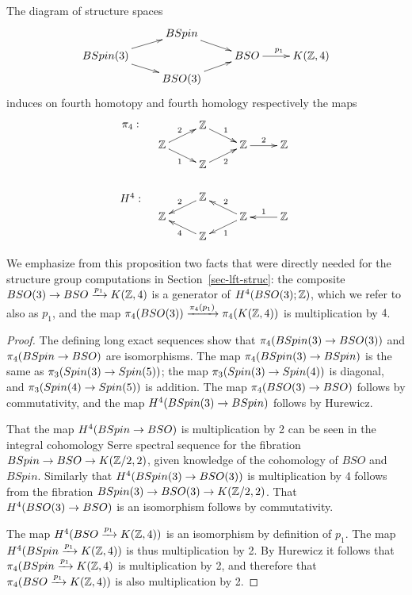 \documentclass{amsart}
\begin{document}
\begin{proposition} 
\label{prop-H4}
The diagram of structure spaces
\[
\xymatrix@R=5pt{
& BSpin \ar[dr] & & \\
BSpin(3) \ar[ur] \ar[dr] && BSO \ar[r]^{p_1} & K(\ZZ,4) \\
& BSO(3) \ar[ur] & &
}
\]
induces on fourth homotopy and fourth homology respectively the maps
\[
\xymatrix@R=5pt{
\save[]+<-1cm,0cm>*{\pi_4:}\restore & \ZZ \ar[dr]^{1} & & \\
\ZZ \ar[ur]^{2} \ar[dr]_{1} && \ZZ \ar[r]^{2} & \ZZ \\
& \ZZ \ar[ur]_{2} & & \\
&&& \\
\save[]+<-1cm,0cm>*{H^4:}\restore & \ZZ \ar[dl]_{2} & & \\
\ZZ && \ZZ \ar[ul]_{2} \ar[dl]^{1} & \ZZ \ar[l]_{1} \\
& \ZZ \ar[ul]^{4} & &
}
\]
\end{proposition}

We emphasize from this proposition two facts that were directly needed for the structure group computations in Section~\ref{sec-lft-struc}: the composite $BSO(3) \rightarrow BSO \xrightarrow{p_1} K(\mathbb Z,4)$ is a generator of $H^4(BSO(3);\mathbb Z)$, which we refer to also as $p_1$, and the map $\pi_4(BSO(3)) \xrightarrow{\pi_4(p_1)} \pi_4(K(\mathbb Z,4))$ is multiplication by $4$.

\begin{proof}
The defining long exact sequences show that $\pi_4(BSpin(3) \rightarrow BSO(3))$ and $\pi_4(BSpin \rightarrow BSO)$ are isomorphisms.  The map $\pi_4(BSpin(3) \rightarrow BSpin)$ is the same as $\pi_3(Spin(3) \rightarrow Spin(5))$; the map $\pi_3(Spin(3) \rightarrow Spin(4))$ is diagonal, and $\pi_3(Spin(4) \rightarrow Spin(5))$ is addition. %
The map $\pi_4(BSO(3) \rightarrow BSO)$ follows by commutativity, and the map $H^4(BSpin(3) \rightarrow BSpin)$ follows by Hurewicz.

That the map $H^4(BSpin \rightarrow BSO)$ is multiplication by 2 can be seen in the integral cohomology Serre spectral sequence for the fibration $BSpin \rightarrow BSO \rightarrow K(\mathbb Z/2,2)$, given knowledge of the cohomology of $BSO$ and $BSpin$.  Similarly that $H^4(BSpin(3) \rightarrow BSO(3))$ is multiplication by 4 follows from the fibration $BSpin(3) \rightarrow BSO(3) \rightarrow K(\mathbb Z/2,2)$.  That $H^4(BSO(3) \rightarrow BSO)$ is an isomorphism follows by commutativity.

The map $H^4(BSO \xrightarrow{p_1} K(\mathbb Z,4))$ is an isomorphism by definition of $p_1$.  The map $H^4(BSpin \xrightarrow{p_1} K(\mathbb Z,4))$ is thus multiplication by 2.  By Hurewicz it follows that $\pi_4(BSpin \xrightarrow{p_1} K(\mathbb Z,4)$ is multiplication by 2, and therefore that $\pi_4(BSO \xrightarrow{p_1} K(\mathbb Z,4))$ is also multiplication by 2.
\end{proof}
\end{document}
